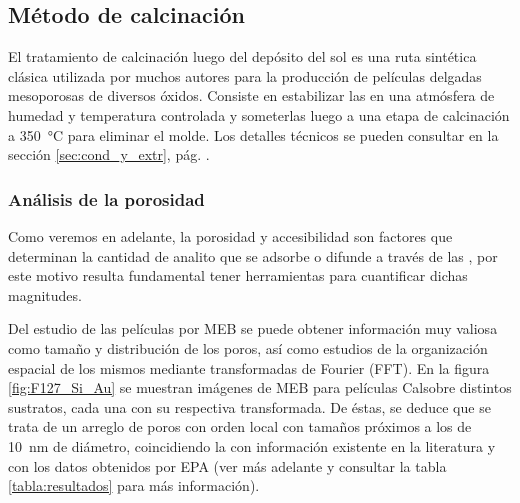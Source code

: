 	  \subsection{Método de calcinación}\label{sub:m_todo_de_calcinaci_n}
	 	
	 		El tratamiento de calcinación luego del depósito del sol es una ruta sintética clásica utilizada por muchos autores para la producción de películas delgadas mesoporosas de diversos óxidos\cite{Soler-Illia2002a,Brinker1999,Soler-Illia2006,Grosso2004,Innocenzi2013,angelome2011}. Consiste en estabilizar las \pdm\space en una atmósfera de humedad y temperatura controlada y someterlas luego a una etapa de calcinación a \SI{350}{\celsius} para eliminar el molde. Los detalles técnicos se pueden consultar en la sección \ref{sec:cond_y_extr}, pág. \pageref{sec:cond_y_extr}.

	 	\subsubsection{Análisis de la porosidad}

		 Como veremos en adelante, la porosidad y accesibilidad son factores que determinan la cantidad de analito que se adsorbe o difunde a través de las \pdm, por este motivo resulta fundamental tener herramientas para cuantificar dichas magnitudes. 

		 Del estudio de las películas por MEB se puede obtener información muy valiosa como tamaño y distribución de los poros, así como estudios de la organización espacial de los mismos mediante transformadas de Fourier (FFT). En la figura \ref{fig:F127_Si_Au} se muestran imágenes de MEB para películas Cal\pdmF\space sobre distintos sustratos, cada una con su respectiva transformada. De éstas, se deduce que se trata de un arreglo de poros con orden local con tamaños próximos a los de \SI{10}{\nm} de diámetro, coincidiendo la con información existente en la literatura\cite{urade2005,angelome2011,lee2006} y con los datos obtenidos por EPA (ver más adelante y consultar la tabla \ref{tabla:resultados} para más información).  

